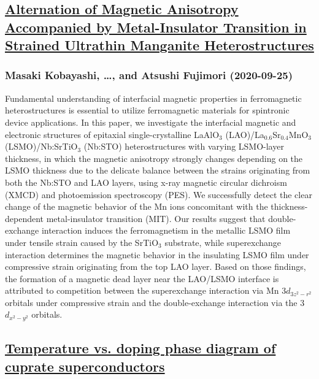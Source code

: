 \subsection*{\href{http://arxiv.org/abs/2009.12327v1}{Alternation of Magnetic Anisotropy Accompanied by Metal-Insulator  Transition in Strained Ultrathin Manganite Heterostructures}}
\subsubsection*{Masaki Kobayashi, \dots, and Atsushi Fujimori (2020-09-25)}
Fundamental understanding of interfacial magnetic properties in ferromagnetic
heterostructures is essential to utilize ferromagnetic materials for spintronic
device applications. In this paper, we investigate the interfacial magnetic and
electronic structures of epitaxial single-crystalline LaAlO$_3$
(LAO)/La$_{0.6}$Sr$_{0.4}$MnO$_3$ (LSMO)/Nb:SrTiO$_3$ (Nb:STO) heterostructures
with varying LSMO-layer thickness, in which the magnetic anisotropy strongly
changes depending on the LSMO thickness due to the delicate balance between the
strains originating from both the Nb:STO and LAO layers, using x-ray magnetic
circular dichroism (XMCD) and photoemission spectroscopy (PES). We successfully
detect the clear change of the magnetic behavior of the Mn ions concomitant
with the thickness-dependent metal-insulator transition (MIT). Our results
suggest that double-exchange interaction induces the ferromagnetism in the
metallic LSMO film under tensile strain caused by the SrTiO$_3$ substrate,
while superexchange interaction determines the magnetic behavior in the
insulating LSMO film under compressive strain originating from the top LAO
layer. Based on those findings, the formation of a magnetic dead layer near the
LAO/LSMO interface is attributed to competition between the superexchange
interaction via Mn 3$d_{3z^2-r^2}$ orbitals under compressive strain and the
double-exchange interaction via the 3$d_{x^2-y^2}$ orbitals.

\subsection*{\href{http://arxiv.org/abs/2009.12322v1}{Temperature vs. doping phase diagram of cuprate superconductors}}
